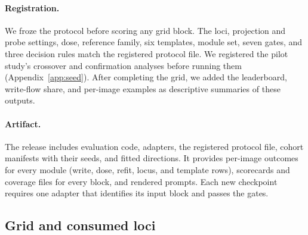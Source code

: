 \documentclass{article}
\begin{document}
\paragraph{Registration.} We froze the protocol before scoring any grid block. The loci, projection and probe settings, dose, reference family, six templates, module set, seven gates, and three decision rules match the registered protocol file. We registered the pilot study's crossover and confirmation analyses before running them (Appendix~\ref{app:seed}). After completing the grid, we added the leaderboard, write-flow share, and per-image examples as descriptive summaries of these outputs.

\paragraph{Artifact.} The release includes evaluation code, adapters, the registered protocol file, cohort manifests with their seeds, and fitted directions. It provides per-image outcomes for every module (write, dose, refit, locus, and template rows), scorecards and coverage files for every block, and rendered prompts. Each new checkpoint requires one adapter that identifies its input block and passes the gates.

\subsection{Grid and consumed loci}
\label{app:cf-grid}
\end{document}
